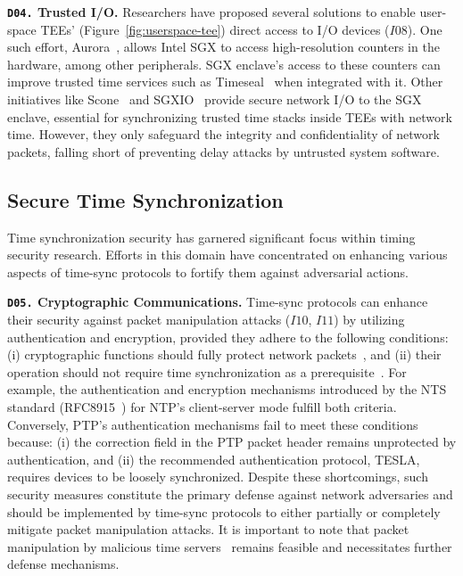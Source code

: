 \noindent\textbf{\texttt{D04.} Trusted I/O.} Researchers have proposed several solutions to enable user-space TEEs' (Figure~\ref{fig:userspace-tee}) direct access to I/O devices ($I08$). One such effort, Aurora~\cite{sandbox-aurora}, allows Intel SGX to access high-resolution counters in the hardware, among other peripherals. SGX enclave's access to these counters can improve trusted time services such as Timeseal~\cite{time-stack-timeseal} when integrated with it. Other initiatives like Scone~\cite{sandbox-scone} and SGXIO~\cite{sgxio} provide secure network I/O to the SGX enclave, essential for synchronizing trusted time stacks inside TEEs with network time. However, they only safeguard the integrity and confidentiality of network packets, falling short of preventing delay attacks by untrusted system software.

\subsection{Secure Time Synchronization}
Time synchronization security has garnered significant focus within timing security research. Efforts in this domain have concentrated on enhancing various aspects of time-sync protocols to fortify them against adversarial actions.

\noindent\textbf{\texttt{D05.} Cryptographic Communications.} Time-sync protocols can enhance their security against packet manipulation attacks ($I10$, $I11$) by utilizing authentication and encryption, provided they adhere to the following conditions: (i) cryptographic functions should fully protect network packets~\cite{net-sync-ptp-covert-channel}, and (ii) their operation should not require time synchronization as a prerequisite~\cite{ntp-replay-drop-attack}. For example, the authentication and encryption mechanisms introduced by the NTS standard (RFC8915~\cite{nts-rfc}) for NTP's client-server mode fulfill both criteria. Conversely, PTP's authentication mechanisms fail to meet these conditions because: (i) the correction field in the PTP packet header remains unprotected by authentication, and (ii) the recommended authentication protocol, TESLA, requires devices to be loosely synchronized. Despite these shortcomings, such security measures constitute the primary defense against network adversaries and should be implemented by time-sync protocols to either partially or completely mitigate packet manipulation attacks. It is important to note that packet manipulation by malicious time servers~\cite{shark-ntp-pool} remains feasible and necessitates further defense mechanisms.

